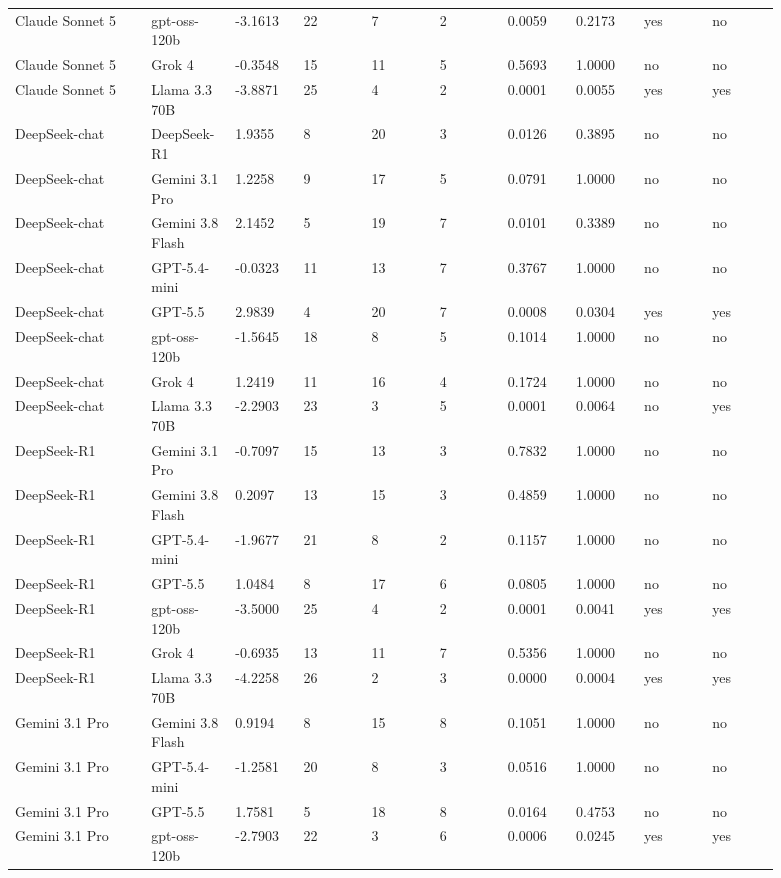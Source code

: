 \begin{landscape}
\begin{longtable}{p{0.162\linewidth}p{0.081\linewidth}p{0.081\linewidth}p{0.081\linewidth}p{0.081\linewidth}p{0.081\linewidth}p{0.081\linewidth}p{0.081\linewidth}p{0.081\linewidth}p{0.081\linewidth}}
Claude Sonnet 5 & gpt-oss-120b & -3.1613 & 22 & 7 & 2 & 0.0059 & 0.2173 & yes & no \\
Claude Sonnet 5 & Grok 4 & -0.3548 & 15 & 11 & 5 & 0.5693 & 1.0000 & no & no \\
Claude Sonnet 5 & Llama 3.3 70B & -3.8871 & 25 & 4 & 2 & 0.0001 & 0.0055 & yes & yes \\
DeepSeek-chat & DeepSeek-R1 & 1.9355 & 8 & 20 & 3 & 0.0126 & 0.3895 & no & no \\
DeepSeek-chat & Gemini 3.1 Pro & 1.2258 & 9 & 17 & 5 & 0.0791 & 1.0000 & no & no \\
DeepSeek-chat & Gemini 3.8 Flash & 2.1452 & 5 & 19 & 7 & 0.0101 & 0.3389 & no & no \\
DeepSeek-chat & GPT-5.4-mini & -0.0323 & 11 & 13 & 7 & 0.3767 & 1.0000 & no & no \\
DeepSeek-chat & GPT-5.5 & 2.9839 & 4 & 20 & 7 & 0.0008 & 0.0304 & yes & yes \\
DeepSeek-chat & gpt-oss-120b & -1.5645 & 18 & 8 & 5 & 0.1014 & 1.0000 & no & no \\
DeepSeek-chat & Grok 4 & 1.2419 & 11 & 16 & 4 & 0.1724 & 1.0000 & no & no \\
DeepSeek-chat & Llama 3.3 70B & -2.2903 & 23 & 3 & 5 & 0.0001 & 0.0064 & no & yes \\
DeepSeek-R1 & Gemini 3.1 Pro & -0.7097 & 15 & 13 & 3 & 0.7832 & 1.0000 & no & no \\
DeepSeek-R1 & Gemini 3.8 Flash & 0.2097 & 13 & 15 & 3 & 0.4859 & 1.0000 & no & no \\
DeepSeek-R1 & GPT-5.4-mini & -1.9677 & 21 & 8 & 2 & 0.1157 & 1.0000 & no & no \\
DeepSeek-R1 & GPT-5.5 & 1.0484 & 8 & 17 & 6 & 0.0805 & 1.0000 & no & no \\
DeepSeek-R1 & gpt-oss-120b & -3.5000 & 25 & 4 & 2 & 0.0001 & 0.0041 & yes & yes \\
DeepSeek-R1 & Grok 4 & -0.6935 & 13 & 11 & 7 & 0.5356 & 1.0000 & no & no \\
DeepSeek-R1 & Llama 3.3 70B & -4.2258 & 26 & 2 & 3 & 0.0000 & 0.0004 & yes & yes \\
Gemini 3.1 Pro & Gemini 3.8 Flash & 0.9194 & 8 & 15 & 8 & 0.1051 & 1.0000 & no & no \\
Gemini 3.1 Pro & GPT-5.4-mini & -1.2581 & 20 & 8 & 3 & 0.0516 & 1.0000 & no & no \\
Gemini 3.1 Pro & GPT-5.5 & 1.7581 & 5 & 18 & 8 & 0.0164 & 0.4753 & no & no \\
Gemini 3.1 Pro & gpt-oss-120b & -2.7903 & 22 & 3 & 6 & 0.0006 & 0.0245 & yes & yes \\

\end{longtable}
\end{landscape}
